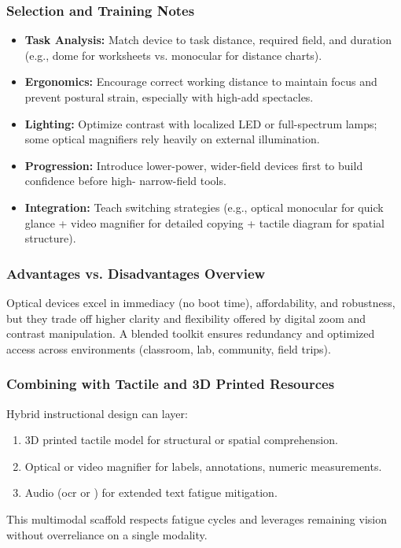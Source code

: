 \subsubsection*{Selection and Training Notes}
\begin{itemize}
	\item \textbf{Task Analysis:} Match device to task distance, required field, and duration (e.g., dome for worksheets vs. monocular for distance charts).
	\item \textbf{Ergonomics:} Encourage correct working distance to maintain focus and prevent postural strain, especially with high-add spectacles.
	\item \textbf{Lighting:} Optimize contrast with localized LED or full-spectrum lamps; some optical magnifiers rely heavily on external illumination.
	\item \textbf{Progression:} Introduce lower-power, wider-field devices first to build confidence before high- narrow-field tools.
	\item \textbf{Integration:} Teach switching strategies (e.g., optical monocular for quick glance + video magnifier for detailed copying + tactile diagram for spatial structure).
\end{itemize}

\subsubsection*{Advantages vs. Disadvantages Overview}
Optical devices excel in immediacy (no boot time), affordability, and robustness, but they trade off higher  clarity and flexibility offered by digital zoom and contrast manipulation.\supercite{OpticalVsElectronicMagnificationReview} A blended toolkit ensures redundancy and optimized access across environments (classroom, lab, community, field trips).

\subsubsection*{Combining  with Tactile and 3D Printed Resources}
Hybrid instructional design can layer:
\begin{enumerate}
	\item 3D printed tactile model for structural or spatial comprehension.
	\item Optical or video magnifier for labels, annotations, numeric measurements.
	\item Audio (\gls{ocr} or ) for extended text fatigue mitigation.
\end{enumerate}
This multimodal scaffold respects fatigue cycles and leverages remaining vision without overreliance on a single modality.

